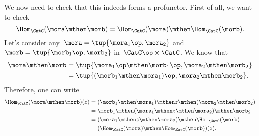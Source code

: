 We now need to check that this indeeds forms a profunctor. First of all, we want to check
\begin{equation*}
    \Hom_\CatC(\mora \mthen \morb)=\Hom_\CatC(\mora)\mthen \Hom_\CatC(\morb).
\end{equation*}
Let's consider any~$\mora=\tup{\mora_1\op, \mora_2}$ and~$\morb=\tup{\morb_1\op,\morb_2}$ in~$\CatC\op \times \CatC$.
We know that
\begin{equation*}
    \begin{aligned}
    \mora\mthen \morb&=\tup{\mora_1\op \mthen \morb_1\op, \mora_2\mthen \morb_2}\\
        &=\tup{(\morb_1\mthen \mora_1)\op, \mora_2\mthen \morb_2}.
    \end{aligned}
\end{equation*}
Therefore, one can write
\begin{equation*}
\begin{aligned}
    \Hom_\CatC(\mora \mthen \morb)(z)&=(\morb_1\mthen \mora_1)\mthen z \mthen (\mora_2\mthen \morb_2)\\
    &=\morb_1\mthen (\mora_1\mthen z \mthen \mora_2) \mthen \morb_2\\
    &=(\mora_1\mthen z \mthen \mora_2)\mthen \Hom_\CatC(\morb)\\
    &=(\Hom_\CatC(\mora)\mthen \Hom_\CatC(\morb))(z).
\end{aligned}
\end{equation*}
\devel{}


